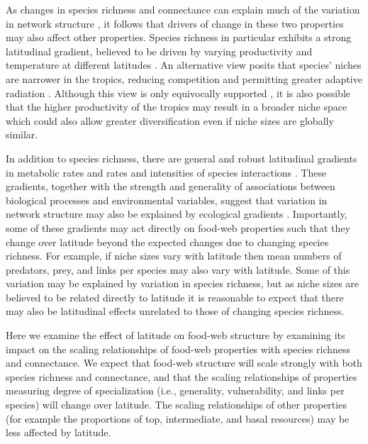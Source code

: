 \documentclass[12pt]{article}
\begin{document}
As changes in species richness and connectance can explain much of the variation in network structure \citep{Vermaat2009}, 
it follows that drivers of change in these two properties may also affect other properties. Species richness in particular 
exhibits a strong latitudinal gradient, believed to be driven by varying productivity and temperature at different latitudes 
\citep{Hawkins2004,Cardillo2005,Thompson2005,Davies2007}. An alternative view
posits that species' niches are narrower in the tropics, 
reducing competition and permitting greater adaptive radiation \citep{}. Although this view is only equivocally supported 
\citep{Vazquez2004}, it is also possible that the higher productivity of the tropics \citep{Brown2004} may result in a broader 
niche space \citep{Davies2007} which could also allow greater diversification even if niche sizes are globally similar.


In addition to species richness, there are general and robust latitudinal gradients in metabolic rates \citep{Stegen2012} and 
rates and intensities of species interactions \citep{Marquis2005,Schemske2009}. These gradients, together with the strength and 
generality of associations between biological processes and environmental variables, suggest that variation in network structure 
may also be explained by ecological gradients \citep{Baiser2012}. Importantly, some of these gradients may act directly 
on food-web properties such that they change over latitude beyond the expected changes due to changing species richness. For 
example, if niche sizes vary with latitude then mean numbers of predators, prey, and links per species may also vary with 
latitude. Some of this variation may be explained by variation in species richness, but as niche sizes are believed to be 
related directly to latitude it is reasonable to expect that there may also be latitudinal effects unrelated to those of 
changing species richness.


Here we examine the effect of latitude on food-web structure by examining
its impact on the scaling relationships of food-web properties with species
richness and connectance. We expect that food-web structure will scale strongly
with both species richness and connectance, and that the scaling relationships
of properties measuring degree of specialization (i.e., generality, vulnerability, and
links per species) will change over latitude. The scaling relationships of other
properties (for example the proportions of top, intermediate, and basal resources) may
be less affected by latitude.
\end{document}
